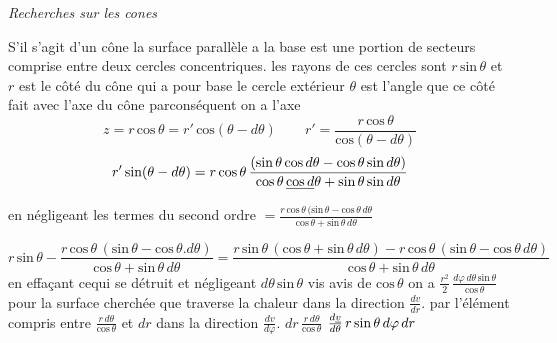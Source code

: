 \documentclass[11pt,a4paper]{article}
\begin{document}
\emph{Recherches sur les  cones}

S'il s'agit d'un cône  la surface parallèle a la base
est une portion de secteurs comprise entre deux cercles concentriques.
les rayons de ces cercles sont $r\,\text{sin}\,\theta$ et  
$r$ est le  côté du cône qui a pour base le cercle
extérieur $\theta$ est l'angle que ce côté fait avec l'axe
du cône parconséquent on a l'axe
\[ z = r\,\text{cos}\,\theta = r'\,\text{cos}(\theta - d\theta) \qquad r' = \frac{r\,\text{cos}\,\theta}{\text{cos}(\theta - d\theta)} \]
\[ r'\,\text{sin}(\theta - d\theta) = r\,\text{cos}\,\theta\,\frac{(\text{sin}\,\theta\,\text{cos}\,d\theta - \text{cos}\,\theta\,\text{sin}\,d\theta)}{\text{cos}\,\theta\,\struck{\text{cos}\,d}\theta + \text{sin}\,\theta\,\text{sin}\,d\theta} \]
en négligeant les termes du second ordre $= \frac{r\,\text{cos}\,\theta\,(\text{sin}\,\theta - \text{cos}\,\theta\,d\theta}{\text{cos}\,\theta + \text{sin}\,\theta\,d\theta}$

\[ r\,\text{sin}\,\theta - \frac{r\,\text{cos}\,\theta\,(\text{sin}\,\theta - \text{cos}\,\theta.d\theta)}{\text{cos}\,\theta + \text{sin}\,\theta\,d\theta} = \frac{r\,\text{sin}\,\theta\,(\text{cos}\,\theta + \text{sin}\,\theta\,d\theta) - r\,\text{cos}\,\theta\,(\text{sin}\,\theta - \text{cos}\,\theta\,d\theta)}{\text{cos}\,\theta + \text{sin}\,\theta\,d\theta} \]
en effaçant cequi se détruit
et négligeant $d\theta\,\text{sin}\,\theta$ vis avis de $\text{cos}\,\theta$ on a
$\frac{r^2}{2}\,\frac{d\varphi\,d\theta\,\text{sin}\,\theta}{\text{cos}\,\theta}$ pour la surface cherchée que traverse la chaleur
dans la direction $\frac{dv}{dr}$. par l'élément compris entre $\frac{r\,d\theta}{\text{cos}\,\theta}$ et $dr$
dans la direction $\frac{dv}{d\varphi}$. $dr\,\frac{r\,d\theta}{\text{cos}\,\theta}$ \quad $\frac{d\uncertain{v}}{d\theta}\,r\,\text{sin}\,\theta\,d\varphi\,dr$
\end{document}
